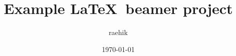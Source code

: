 \documentclass{beamer}
\begin{document}
\title{Example \LaTeX\ beamer project}
\author{raehik}
\date{\today}

\ifXeTeX
\fi
\end{document}
